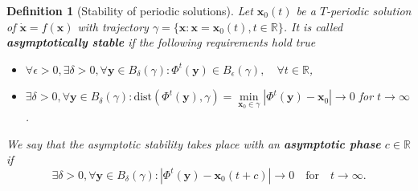 \documentclass[hidelinks,a4paper, 11pt]{article}
\theoremstyle{plain}
\theoremstyle{break}
\theoremstyle{plain}
\newtheorem{definition}[theorem]{Definition}
\theoremstyle{definition}
\begin{document}
{\begin{definition}[Stability of periodic solutions]
	Let $\mathbf x_0(t)$ be a $T$-periodic solution of $\mathbf{\dot x} = f(\mathbf x)$ with trajectory $\gamma = \{ \mathbf x : \mathbf x = \mathbf x_0(t), t \in \mathbb R \}$. It is called \textbf{asymptotically stable} if the following requirements hold true
	\begin{itemize}
		\item $\forall \epsilon >0, \exists \delta > 0, \forall \mathbf y \in B_{\delta}(\gamma): \Phi^t(\mathbf y) \in B_{\epsilon}(\gamma), \quad \forall t \in \mathbb R$,
		\item $\exists \delta > 0, \forall \mathbf y \in B_{\delta}(\gamma): \mathrm{dist}(\Phi^t(\mathbf y), \gamma) = \min\limits_{\mathbf x_0 \in \gamma} |\Phi^t(\mathbf y) - \mathbf x_0| \to 0$ for $t \to \infty$.
	\end{itemize}
	We say that the asymptotic stability takes place with an \textbf{asymptotic phase} $c \in \mathbb R$ if $$\exists \delta > 0, \forall \mathbf y \in B_{\delta}(\gamma): |\Phi^t(\mathbf y) - \mathbf x_0(t+c)| \to 0 \quad \text{for} \quad t \to \infty.$$
\end{definition}


}
\end{document}
